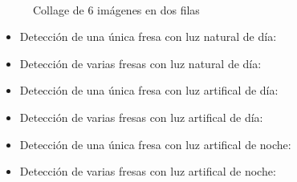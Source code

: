 \begin{figure}[H]
  \centering

  \hspace{5mm}
  \hspace{5mm}

  \\[5mm] %

  \hspace{5mm}
  \hspace{5mm}
  \caption{Collage de 6 imágenes en dos filas}
  \label{fig:collage_6}
\end{figure}







\begin{itemize}
	\item{Detección de una única fresa con luz natural de día:} 
	\item{Detección de varias fresas con luz natural de día:}
	\item{Detección de una única fresa con luz artifical de día:} 
	\item{Detección de varias fresas con luz artifical de día:} 
	\item{Detección de una única fresa con luz artifical de noche:}
	\item{Detección de varias fresas con luz artifical de noche:} 

\end{itemize}








